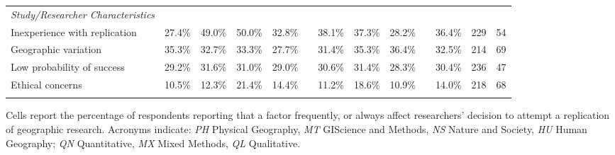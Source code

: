 \documentclass[]{interact}
\theoremstyle{plain}%
\theoremstyle{definition}
\theoremstyle{remark}
\begin{document}
\begin{landscape}
\begin{table}[h]
\begin{threeparttable}
\begin{tabular}{l c c c c c c c c c c c c}
         \textit{Study/Researcher Characteristics}     & & & & & & & & & & & & \\
         Inexperience with replication      & 27.4\% & 49.0\% & 50.0\% & 32.8\% & & 38.1\% & 37.3\% & 28.2\% & & 36.4\% & 229 & 54 \\
         Geographic variation               & 35.3\% & 32.7\% & 33.3\% & 27.7\% & & 31.4\% & 35.3\% & 36.4\% & & 32.5\% & 214 & 69 \\
         Low probability of success         & 29.2\% & 31.6\% & 31.0\% & 29.0\% & & 30.6\% & 31.4\% & 28.3\% & & 30.4\% & 236 & 47 \\
         Ethical concerns                   & 10.5\% & 12.3\% & 21.4\% & 14.4\% & & 11.2\% & 18.6\% & 10.9\% & & 14.0\% & 218 & 68 \\
                                            & & & & & & & & & & & & \\
        \hline
    \end{tabular}
    \begin{tablenotes}
        \footnotesize
        \item Cells report the percentage of respondents reporting that a factor frequently, or always affect researchers' decision to attempt a replication of geographic research. Acronyms indicate: \textit{PH} Physical Geography, \textit{MT} GIScience and Methods, \textit{NS} Nature and Society, \textit{HU} Human Geography; \textit{QN} Quantitative, \textit{MX} Mixed Methods, \textit{QL} Qualitative. 
    \end{tablenotes}
    \label{tab:motivations}
    \end{threeparttable}
\end{table}
\end{landscape}

\newpage
\end{document}
